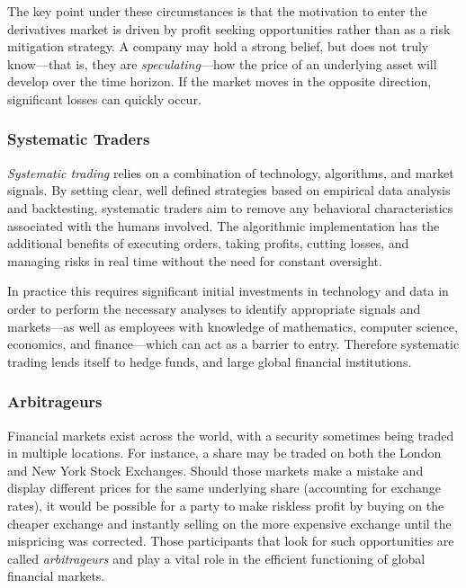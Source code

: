 
The key point under these circumstances is that the motivation to enter the derivatives market is driven by profit seeking opportunities rather than as a risk mitigation strategy. A company may hold a strong belief, but does not truly know––that is, they are \textit{speculating}––how the price of an underlying asset will develop over the time horizon. If the market moves in the opposite direction, significant losses can quickly occur.

\subsubsection*{Systematic Traders}
\textit{Systematic trading} relies on a combination of technology, algorithms, and market signals. By setting clear, well defined strategies based on empirical data analysis and backtesting, systematic traders aim to remove any behavioral characteristics associated with the humans involved. The algorithmic implementation has the additional benefits of executing orders, taking profits, cutting losses, and managing risks in real time without the need for constant oversight. 

In practice this requires significant initial investments in technology and data in order to perform the necessary analyses to identify appropriate signals and markets––as well as employees with knowledge of mathematics, computer science, economics, and finance––which can act as a barrier to entry. Therefore systematic trading lends itself to hedge funds, and large global financial institutions.

\subsubsection*{Arbitrageurs}
Financial markets exist across the world, with a security sometimes being traded in multiple locations. For instance, a share may be traded on both the London and New York Stock Exchanges. Should those markets make a mistake and display different prices for the same underlying share (accounting for exchange rates), it would be possible for a party to make riskless profit by buying on the cheaper exchange and instantly selling on the more expensive exchange until the mispricing was corrected. Those participants that look for such opportunities are called \textit{arbitrageurs} and play a vital role in the efficient functioning of global financial markets. 

